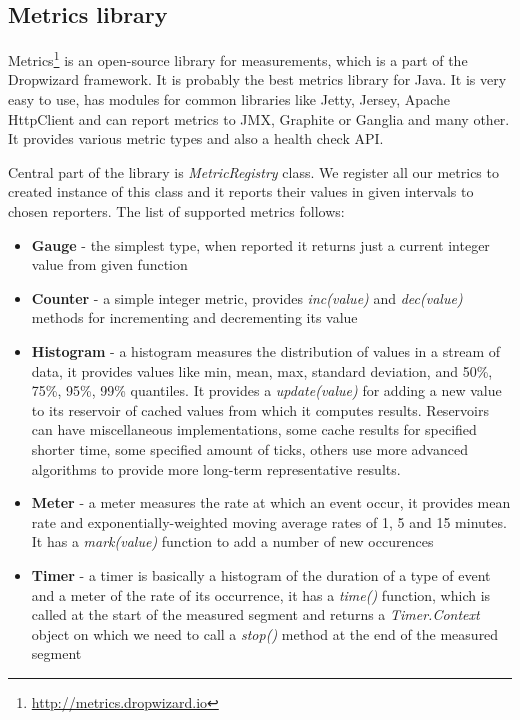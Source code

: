 \documentclass[12pt,oneside]{fithesis2}
\begin{document}
\subsection{Metrics library}

Metrics\footnote{\url{http://metrics.dropwizard.io}} is an open-source library for measurements, which is a part of the Dropwizard framework. It is probably the best metrics library for Java. It is very easy to use, has modules for common libraries like Jetty, Jersey, Apache HttpClient and can report metrics to JMX, Graphite or Ganglia and many other. It provides various metric types and also a health check API.

Central part of the library is \textit{MetricRegistry} class. We register all our metrics to created instance of this class and it reports their values in given intervals to chosen reporters. The list of supported metrics follows\cite{metrics}:

\begin{itemize}
\item \textbf{Gauge} - the simplest type, when reported it returns just a current integer value from given function
\item \textbf{Counter} - a simple integer metric, provides \textit{inc(value)} and \textit{dec(value)} methods for incrementing and decrementing its value
\item \textbf{Histogram} - a histogram measures the distribution of values in a stream of data, it provides values like min, mean, max, standard deviation, and 50\%, 75\%, 95\%, 99\% quantiles. It provides a \textit{update(value)} for adding a new value to its reservoir of cached values from which it computes results. Reservoirs can have miscellaneous implementations, some cache results for specified shorter time, some specified amount of ticks, others use more advanced algorithms to provide more long-term representative results.
\item \textbf{Meter} - a meter measures the rate at which an event occur, it provides mean rate and exponentially-weighted moving average rates of 1, 5 and 15 minutes. It has a \textit{mark(value)} function to add a number of new occurences
\item \textbf{Timer} - a timer is basically a histogram of the duration of a type of event and a meter of the rate of its occurrence, it has a \textit{time()} function, which is called at the start of the measured segment and returns a \textit{Timer.Context} object on which we need to call a \textit{stop()} method at the end of the measured segment
\end{itemize}
\end{document}
